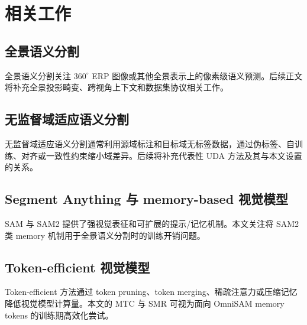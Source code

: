 \section{相关工作}
\label{sec:related_work}

\subsection{全景语义分割}
全景语义分割关注 $360^\circ$ ERP 图像或其他全景表示上的像素级语义预测。后续正文将补充全景投影畸变、跨视角上下文和数据集协议相关工作。

\subsection{无监督域适应语义分割}
无监督域适应语义分割通常利用源域标注和目标域无标签数据，通过伪标签、自训练、对齐或一致性约束缩小域差异。后续将补充代表性 UDA 方法及其与本文设置的关系。

\subsection{Segment Anything 与 memory-based 视觉模型}
SAM 与 SAM2 提供了强视觉表征和可扩展的提示/记忆机制。本文关注将 SAM2 类 memory 机制用于全景语义分割时的训练开销问题。

\subsection{Token-efficient 视觉模型}
Token-efficient 方法通过 token pruning、token merging、稀疏注意力或压缩记忆降低视觉模型计算量。本文的 MTC 与 SMR 可视为面向 OmniSAM memory tokens 的训练期高效化尝试。
